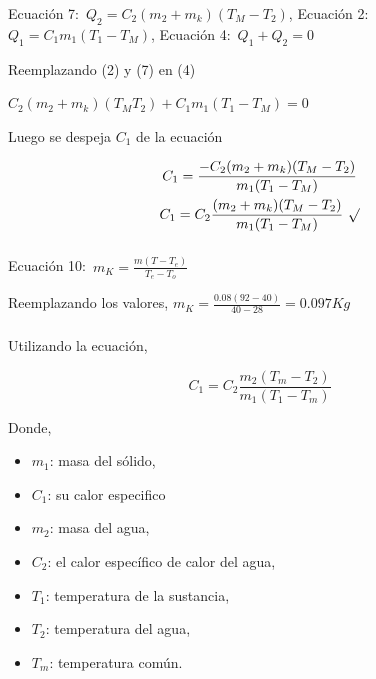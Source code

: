 \documentclass[letterpaper, 12pt]{article}
\begin{document}
\subsubsection{}

Ecuación 7:~$Q_2 = C_2 (m_2 + m_k)(T_M - T_2)$, Ecuación
2:~$Q_1 = C_1 m_1 (T_1 - T_M)$, Ecuación 4:~$Q_1 + Q_2 = 0$

Reemplazando (2) y (7) en (4)

$C_2 (m_2 + m_k)(T_M T_2) + C_1 m_1 (T_1 - T_M) = 0$

Luego se despeja $C_1$ de la ecuación

\begin{equation*}
      \begin{gathered}
            C_1 = \frac{- C_2(m_2 + m_k)(T_M - T_2)}{m_1 (T_1 - T_M)} \\
            C_1 = C_2 \frac{(m_2 + m_k)(T_M - T_2)}{m_1 (T_1 - T_M)}~\surd
      \end{gathered}
\end{equation*}

\subsubsection{}

Ecuación 10:~$m_K = \frac{m (T - T_e)}{T_e - T_o}$

Reemplazando los valores, $m_K = \frac{0.08 (92 - 40)}{40 -
            28} = 0.097 Kg$

\subsubsection{}

Utilizando la ecuación,

\begin{equation}
      C_{1} = C_{2} \frac{m_{2} (T_{m} - T_{2})}{m_1 (T_{1} - T_{m})}
      \label{eq:calor_especifico_1}
\end{equation}

Donde,

\begin{itemize}[label=$\triangleright$]
      \item $m_{1}$: masa del sólido,
      \item $C_{1}$: su calor especifico
      \item $m_{2}$: masa del agua,
      \item $C_{2}$: el calor específico de calor del agua,
      \item $T_{1}$: temperatura de la sustancia,
      \item $T_{2}$: temperatura del agua,
      \item $T_{m}$: temperatura común.
\end{itemize}
\end{document}
